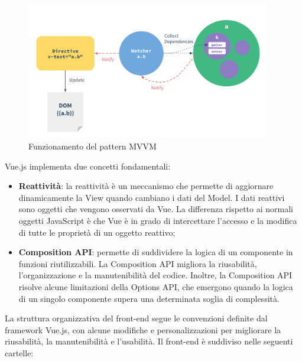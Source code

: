\begin{figure}[H]
  \centering
  \includegraphics[width=0.95\textwidth]{assets/Frontend/overview_mvvm.png}
  \caption{Funzionamento del pattern MVVM}
\end{figure}

\par Vue.js implementa due concetti fondamentali:
\begin{itemize}
  \item \textbf{Reattività}: la reattività è un meccanismo che permette di aggiornare dinamicamente la View quando cambiano i dati del Model. I dati reattivi sono oggetti che vengono osservati da Vue. La differenza rispetto ai normali oggetti JavaScript è che Vue è in grado di intercettare l'accesso e la modifica di tutte le proprietà di un oggetto reattivo;
  \item \textbf{Composition API}: permette di suddividere la logica di un componente in funzioni riutilizzabili. La Composition API migliora la riusabilità, l'organizzazione e la manutenibilità del codice. Inoltre, la Composition API risolve alcune limitazioni della Options API, che emergono quando la logica di un singolo componente supera una determinata soglia di complessità.
\end{itemize}

\vspace{0.5\baselineskip}
\par La struttura organizzativa del front-end segue le convenzioni definite dal framework Vue.js, con alcune modifiche e personalizzazioni per migliorare la riusabilità, la manutenibilità e l'usabilità. Il front-end è suddiviso nelle seguenti cartelle:

\begin{minipage}{\textwidth}
\end{minipage}

